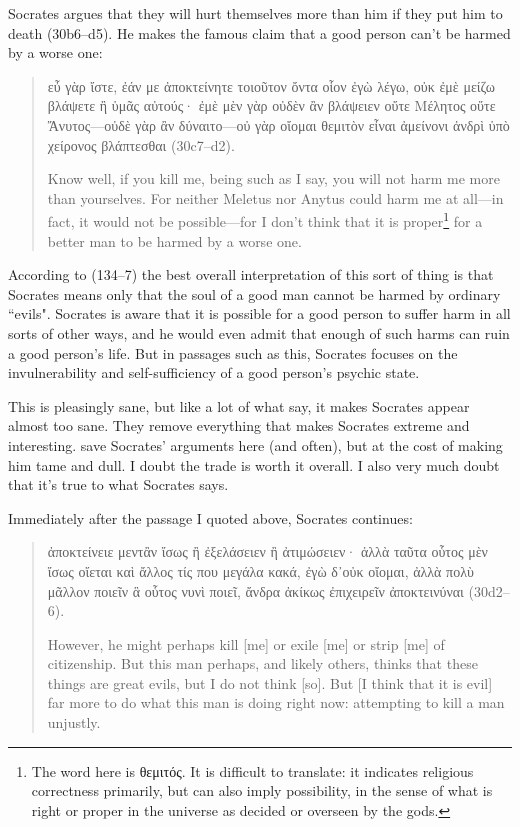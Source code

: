 \documentclass[11pt]{article}
\begin{document}
Socrates argues that they will hurt themselves more than him if they put him to
death (30b6--d5).  He makes the famous claim that a good person can't be harmed
by a worse one:

\begin{quote}
    {\g εὖ γὰρ ἴστε, ἐάν με ἀποκτείνητε τοιοῦτον ὄντα οἷον ἐγὼ λέγω, οὐκ ἐμὲ
    μείζω βλάψετε ἢ ὑμᾶς αὐτούς· ἐμὲ μὲν γὰρ οὐδὲν ἂν βλάψειεν οὔτε Μέλητος
    οὔτε Ἄνυτος---οὐδὲ γὰρ ἂν δύναιτο---οὐ γὰρ οἴομαι θεμιτὸν εἶναι ἀμείνονι
    ἀνδρὶ ὑπὸ χείρονος βλάπτεσθαι} (30c7--d2).

    Know well, if you kill me, being such as I say, you will not harm me more
    than yourselves. For neither Meletus nor Anytus could harm me at all---in
    fact, it would not be possible---for I don't think that it is
    proper\footnote{The word here is {\g θεμιτός}.  It is difficult to
    translate: it indicates religious correctness primarily, but can also imply
    possibility, in the sense of what is right or proper in the universe as
    decided or overseen by the gods.} for a better man to be harmed by a worse
    one.
\end{quote}

According to \citet{brickhouse2004} (134--7) the best overall interpretation of
this sort of thing is that Socrates means only that the soul of a good man
cannot be harmed by ordinary ``evils".  Socrates is aware that it is possible
for a good person to suffer harm in all sorts of other ways, and he would even
admit that enough of such harms can ruin a good person's life.  But in passages
such as this, Socrates focuses on the invulnerability and self-sufficiency of
a good person's psychic state.

This is pleasingly sane, but like a lot of what \citeauthor{brickhouse2004}
say, it makes Socrates appear almost too sane.  They remove everything that
makes Socrates extreme and interesting.  \citeauthor{brickhouse2004} save
Socrates' arguments here (and often), but at the cost of making him tame and
dull.  I doubt the trade is worth it overall.  I also very much doubt that it's
true to what Socrates says.

Immediately after the passage I quoted above, Socrates continues:

\begin{quote}
    {\g ἀποκτείνειε μεντἂν ἴσως ἢ ἐξελάσειεν ἢ ἀτιμώσειεν· ἀλλὰ ταῦτα οὗτος μὲν
    ἴσως οἴεται καὶ ἄλλος τίς που μεγάλα κακά, ἐγὼ δ᾽οὐκ οἴομαι, ἀλλὰ πολὺ
    μᾶλλον ποιεῖν ἃ οὗτος νυνὶ ποιεῖ, ἄνδρα ἀκίκως ἐπιχειρεῖν ἀποκτεινύναι}
    (30d2--6).

    However, he might perhaps kill [me] or exile [me] or strip [me] of
    citizenship. But this man perhaps, and likely others, thinks that these
    things are great evils, but I do not think [so]. But [I think that it is
    evil] far more to do what this man is doing right now: attempting to kill
    a man unjustly.
\end{quote}
\end{document}
